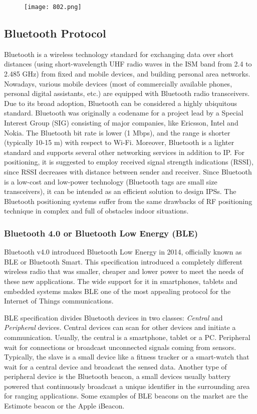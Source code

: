 \begin{figure}[h!tb]
\centering\texttt{[image: 802.png]}
\caption{}
\label{fig:802}
\end{figure}

\subsection{Bluetooth Protocol}
Bluetooth is a wireless technology standard for exchanging data over short distances (using short-wavelength UHF radio waves in the ISM band from 2.4 to 2.485 GHz) from fixed and mobile devices, and building personal area networks.
Nowadays, various mobile devices (most of commercially available phones, personal digital assistants, etc.) are equipped with Bluetooth radio transceivers. Due to its broad adoption, Bluetooth can be considered a highly ubiquitous standard. Bluetooth was originally a codename for a project lead by a Special Interest Group (SIG) consisting of major companies, like Ericsson, Intel and Nokia. The Bluetooth bit rate is lower (1 Mbps), and the range is shorter (typically
10-15 m) with respect to Wi-Fi. Moreover, Bluetooth is a lighter standard and supports several other networking services in addition to IP. For positioning, it is suggested to employ received signal strength indications (RSSI), since RSSI decreases with distance between sender and receiver. Since Bluetooth is a low-cost and low-power technology (Bluetooth tags are small size transceivers), it can be intended as an efficient solution to design IPSs. The Bluetooth positioning systems suffer from the same drawbacks of RF positioning technique in complex and full of obstacles indoor situations.


\subsubsection{Bluetooth 4.0 or Bluetooth Low Energy (BLE)}
\label{subsec:BLEprotocol}

Bluetooth v4.0 introduced Bluetooth Low Energy in 2014, officially known as BLE or Bluetooth Smart. This specification introduced a completely different wireless radio that was smaller, cheaper and lower power to meet the needs of these new applications. The wide support for it in smartphones, tablets and embedded systems makes BLE one of the most appealing protocol for the Internet of Things communications.

\smallskip
BLE specification divides Bluetooth devices in two classes: \emph{Central} and \emph{Peripheral} devices. Central devices can scan for other devices and initiate a communication. Usually, the central is a smartphone, tablet or a PC.
Peripheral wait for connections or broadcast unconnected signals coming from sensors. Typically, the slave is a small device like a fitness tracker or a smart-watch that wait for a central device and broadcast the sensed data.
Another type of peripheral device is the Bluetooth beacon, a small devices usually battery powered that continuously broadcast a unique identifier in the surrounding area for ranging applications. Some examples of BLE beacons on the market are the Estimote beacon or the Apple iBeacon.

